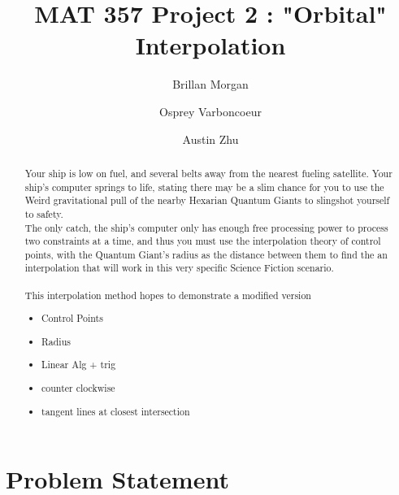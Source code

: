 \documentclass[sigconf]{acmart}
\begin{document}




\title{MAT 357 Project 2 : "Orbital" Interpolation}
\author{Brillan Morgan}
\author{Osprey Varboncoeur}
\author{Austin Zhu}

\begin{abstract}
Your ship is low on fuel, and several belts away from the nearest fueling satellite. Your ship's computer springs to life, stating there may be a slim chance for you to use the Weird gravitational pull of the nearby Hexarian Quantum Giants to slingshot yourself to safety. \\
The only catch, the ship's computer only has enough free processing power to process two constraints at a time, and thus you must use the interpolation theory of control points, with the Quantum Giant's radius as the distance between them to find the an interpolation that will work in this very specific Science Fiction scenario.  \\ \\
This interpolation method hopes to demonstrate a modified version 
\begin{itemize}
    \item Control Points
    \item Radius
    \item Linear Alg + trig 
    \item counter clockwise 
    \item tangent lines at closest intersection
\end{itemize}

\end{abstract}



\maketitle

\section{Problem Statement}

    
\end{document}
